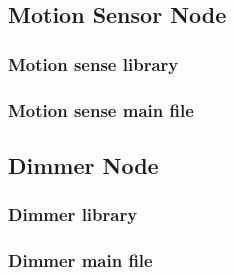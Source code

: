 \pagebreak


\subsection{Motion Sensor Node}
\label{an:motion-code}

\subsubsection{Motion sense library}



\subsubsection{Motion sense main file}


\pagebreak

\subsection{Dimmer Node}
\label{an:dimmer-code}

\subsubsection{Dimmer library}



\subsubsection{Dimmer main file}


\pagebreak

